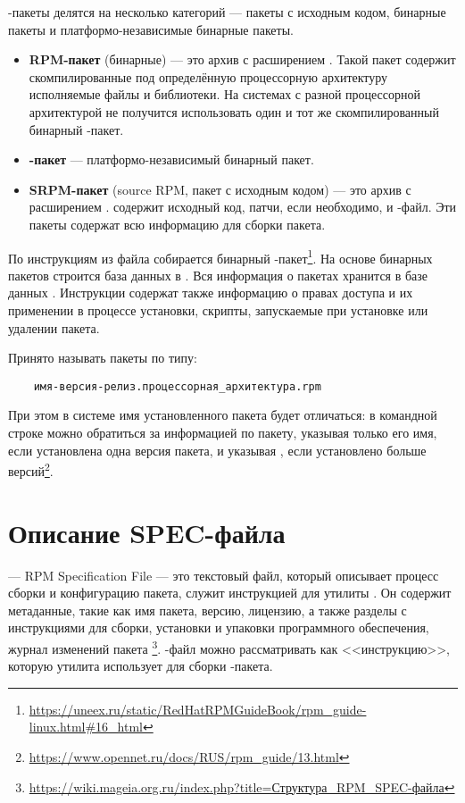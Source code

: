 -пакеты делятся на несколько категорий --- пакеты с исходным кодом, бинарные пакеты и платформо-независимые бинарные пакеты.
\begin{itemize}
	\item \textbf{RPM-пакет} (бинарные) --- это архив с расширением . Такой пакет содержит скомпилированные под определённую процессорную архитектуру исполняемые файлы и библиотеки. На системах с разной процессорной архитектурой не получится использовать один и тот же скомпилированный бинарный -пакет.
	
	\item \textbf{-пакет} --- платформо-независимый бинарный пакет.
	
	\item \textbf{SRPM-пакет} (source RPM, пакет с исходным кодом) --- это архив с расширением .  содержит исходный код, патчи, если необходимо, и -файл. Эти пакеты содержат всю информацию для сборки пакета.
\end{itemize}

По инструкциям из  файла собирается бинарный -пакет\footnote{\href{https://uneex.ru/static/RedHatRPMGuideBook/rpm_guide-linux.html\#16_html}{https://uneex.ru/static/RedHatRPMGuideBook/rpm\_guide-linux.html\#16\_html}}. На основе бинарных пакетов строится база данных в . Вся информация о пакетах хранится в базе данных . Инструкции содержат также информацию о правах доступа и их применении в процессе установки, скрипты, запускаемые при установке или удалении пакета.

Принято называть пакеты  по типу:

\begin{verbatim}
	имя-версия-релиз.процессорная_архитектура.rpm
\end{verbatim}

При этом в системе имя установленного пакета будет отличаться: в командной строке можно обратиться за информацией по пакету, указывая только его имя, если установлена одна версия пакета, и указывая , если установлено больше версий\footnote{\href{https://www.opennet.ru/docs/RUS/rpm_guide/13.html}{https://www.opennet.ru/docs/RUS/rpm\_guide/13.html}}.


\section{Описание SPEC-файла}
 --- RPM Specification File --- это текстовый файл, который описывает процесс сборки и конфигурацию пакета, служит инструкцией для утилиты . Он содержит метаданные, такие как имя пакета, версию, лицензию, а также разделы с инструкциями для сборки, установки и упаковки программного обеспечения, журнал изменений пакета \footnote{\href{https://wiki.mageia.org.ru/index.php?title=\%D0\%A1\%D1\%82\%D1\%80\%D1\%83\%D0\%BA\%D1\%82\%D1\%83\%D1\%80\%D0\%B0_RPM_SPEC-\%D1\%84\%D0\%B0\%D0\%B9\%D0\%BB\%D0\%B0}{https://wiki.mageia.org.ru/index.php?title=Структура\_RPM\_SPEC-файла}}. -файл можно рассматривать как <<инструкцию>>, которую утилита  использует для сборки -пакета.

